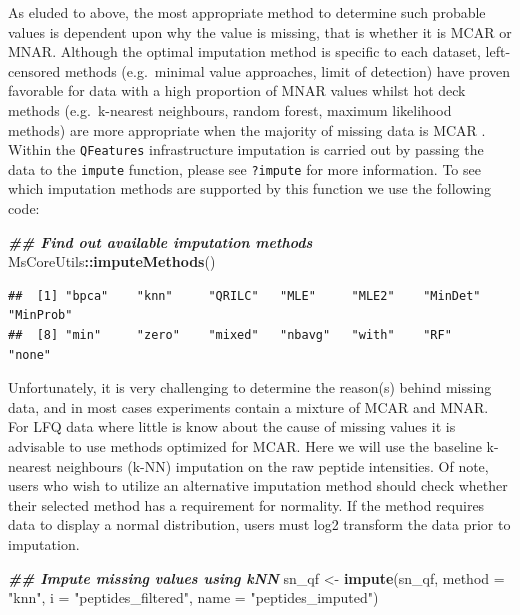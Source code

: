 \documentclass[9pt,a4paper,]{extarticle}
\newenvironment{Shaded}{\begin{snugshade}}{\end{snugshade}}
\newcommand{\AttributeTok}[1]{\textcolor[rgb]{0.13,0.29,0.53}{#1}}
\newcommand{\DocumentationTok}[1]{\textcolor[rgb]{0.56,0.35,0.01}{\textbf{\textit{#1}}}}
\newcommand{\FunctionTok}[1]{\textcolor[rgb]{0.13,0.29,0.53}{\textbf{#1}}}
\newcommand{\NormalTok}[1]{#1}
\newcommand{\OtherTok}[1]{\textcolor[rgb]{0.56,0.35,0.01}{#1}}
\newcommand{\SpecialCharTok}[1]{\textcolor[rgb]{0.81,0.36,0.00}{\textbf{#1}}}
\newcommand{\StringTok}[1]{\textcolor[rgb]{0.31,0.60,0.02}{#1}}
\begin{document}
As eluded to above, the most appropriate method to determine such probable
values is dependent upon why the value is missing, that is whether it is MCAR or
MNAR. Although the optimal imputation method is specific to each dataset,
left-censored methods (e.g.~minimal value approaches, limit of detection) have
proven favorable for data with a high proportion of MNAR values whilst hot deck
methods (e.g.~k-nearest neighbours, random forest, maximum likelihood methods)
are more appropriate when the majority of missing data is MCAR \citep[e.g.,][]{Liu2021, Lazar2016}. Within the \texttt{QFeatures} infrastructure imputation is carried out by
passing the data to the \texttt{impute} function, please see \texttt{?impute} for more
information. To see which imputation methods are supported by this function we
use the following code:

\begin{Shaded}
\begin{Highlighting}[]
\DocumentationTok{\#\# Find out available imputation methods}
\NormalTok{MsCoreUtils}\SpecialCharTok{::}\FunctionTok{imputeMethods}\NormalTok{()}
\end{Highlighting}
\end{Shaded}

\begin{verbatim}
##  [1] "bpca"    "knn"     "QRILC"   "MLE"     "MLE2"    "MinDet"  "MinProb"
##  [8] "min"     "zero"    "mixed"   "nbavg"   "with"    "RF"      "none"
\end{verbatim}

Unfortunately, it is very challenging to determine the reason(s) behind missing
data, and in most cases experiments contain a mixture of MCAR and MNAR. For LFQ
data where little is know about the cause of missing values it is advisable to
use methods optimized for MCAR. Here we will use the baseline k-nearest
neighbours (k-NN) imputation on the raw peptide intensities. Of note, users who
wish to utilize an alternative imputation method should check whether their
selected method has a requirement for normality. If the method requires data to
display a normal distribution, users must log2 transform the data prior to
imputation.

\begin{Shaded}
\begin{Highlighting}[]
\DocumentationTok{\#\# Impute missing values using kNN}
\NormalTok{sn\_qf }\OtherTok{\textless{}{-}} \FunctionTok{impute}\NormalTok{(sn\_qf,}
                \AttributeTok{method =} \StringTok{"knn"}\NormalTok{, }
                \AttributeTok{i =} \StringTok{"peptides\_filtered"}\NormalTok{,}
                \AttributeTok{name =} \StringTok{"peptides\_imputed"}\NormalTok{)}
\end{Highlighting}
\end{Shaded}
\end{document}
